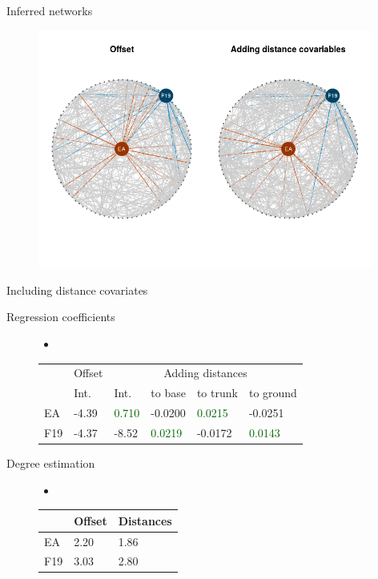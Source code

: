 \documentclass{beamer}
\newcommand{\pos}[1]{\textcolor{Darkgreen}{#1}}
\newcommand{\nega}[1]{\textcolor{Nicered}{#1}}
\begin{document}
\begin{frame}{Inferred networks}
\begin{figure}[htp]
\centering
\includegraphics[width=11cm]{compare_reseaux.png}

\end{figure}

\end{frame}

\begin{frame}{Including distance covariates}
	\begin{description}
	\item[Regression coefficients]\begin{itemize}
	\item []
\end{itemize} \begin{table}[]
\begin{tabular}{l|lllll}
    & Offset & \multicolumn{4}{|c}{Adding distances}   \\\cline{2-6}
    & \multicolumn{1}{l|}{Int.}  & Int.  & to base & to trunk & to ground \\\hline
EA  & \nega{-4.39}  &\pos{ 0.710 }&  \nega{-0.0200} &\pos{ 0.0215  } &  \nega{-0.0251  } \\
F19 &  \nega{-4.37}  &  \nega{-8.52} & \pos{0.0219 } &  \nega{-0.0172}  & \pos{0.0143  } 
\end{tabular}
\end{table}
	\item[Degree estimation]\begin{itemize}
	\item []
\end{itemize} \begin{table}[]
\begin{tabular}{l|ll}
    & Offset & Distances \\\hline
EA  & 2.20   & 1.86      \\
F19 & 3.03   & 2.80     
\end{tabular}
\end{table}
\end{description}
\end{frame}
\end{document}
